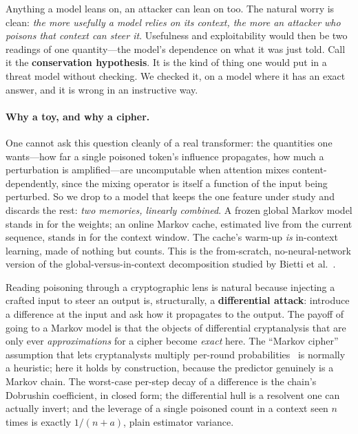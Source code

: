 \documentclass[11pt]{article}
\theoremstyle{plain}
\theoremstyle{definition}
\theoremstyle{remark}
\begin{document}
Anything a model leans on, an attacker can lean on too. The natural worry is clean:
\emph{the more usefully a model relies on its context, the more an attacker who poisons
that context can steer it}. Usefulness and exploitability would then be two readings of one
quantity---the model's dependence on what it was just told. Call it the
\textbf{conservation hypothesis}. It is the kind of thing one would put in a threat model
without checking. We checked it, on a model where it has an exact answer, and it is wrong
in an instructive way.

\paragraph{Why a toy, and why a cipher.}
One cannot ask this question cleanly of a real transformer: the quantities one wants---how
far a single poisoned token's influence propagates, how much a perturbation is
amplified---are uncomputable when attention mixes content-dependently, since the mixing
operator is itself a function of the input being perturbed. So we drop to a model that
keeps the one feature under study and discards the rest: \emph{two memories, linearly
combined}. A frozen global Markov model stands in for the weights; an online Markov cache,
estimated live from the current sequence, stands in for the context window. The cache's
warm-up \emph{is} in-context learning, made of nothing but counts. This is the
from-scratch, no-neural-network version of the global-versus-in-context decomposition
studied by Bietti et al.~\cite{bietti2023}.

Reading poisoning through a cryptographic lens is natural because injecting a crafted input
to steer an output is, structurally, a \textbf{differential attack}: introduce a difference
at the input and ask how it propagates to the output. The payoff of going to a Markov model
is that the objects of differential cryptanalysis that are only ever \emph{approximations}
for a cipher become \emph{exact} here. The ``Markov cipher'' assumption that lets
cryptanalysts multiply per-round probabilities~\cite{lai1991} is normally a heuristic; here
it holds by construction, because the predictor genuinely is a Markov chain. The
worst-case per-step decay of a difference is the chain's Dobrushin coefficient, in closed
form; the differential hull is a resolvent one can actually invert; and the leverage of a
single poisoned count in a context seen $n$ times is exactly $1/(n+a)$, plain estimator
variance.
\end{document}

